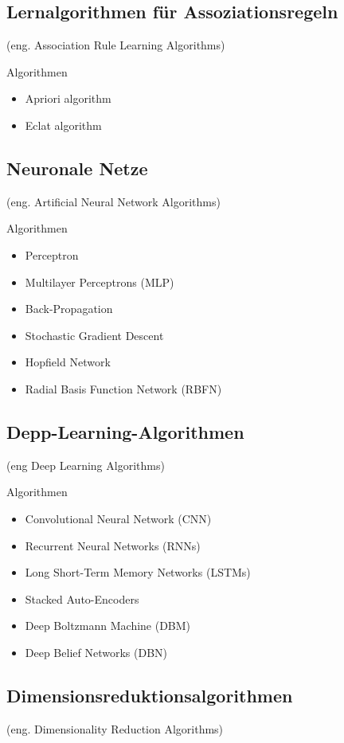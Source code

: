 \subsection{Lernalgorithmen für Assoziationsregeln}
(eng. Association Rule Learning Algorithms)\vspace{0.2cm}

Algorithmen
\begin{itemize}
	\item Apriori algorithm
	\item Eclat algorithm
\end{itemize}

\subsection{Neuronale Netze}
(eng. Artificial Neural Network Algorithms)\vspace{0.2cm}

Algorithmen
\begin{itemize}
	\item Perceptron
	\item Multilayer Perceptrons (MLP)
	\item Back-Propagation
	\item Stochastic Gradient Descent
	\item Hopfield Network
	\item Radial Basis Function Network (RBFN)
\end{itemize}

\subsection{Depp-Learning-Algorithmen}
(eng Deep Learning Algorithms)\vspace{0.2cm}

Algorithmen
\begin{itemize}
	\item Convolutional Neural Network (CNN)
	\item Recurrent Neural Networks (RNNs)
	\item Long Short-Term Memory Networks (LSTMs)
	\item Stacked Auto-Encoders
	\item Deep Boltzmann Machine (DBM)
	\item Deep Belief Networks (DBN)
\end{itemize}

\subsection{Dimensionsreduktionsalgorithmen}
(eng. Dimensionality Reduction Algorithms)\vspace{0.2cm}

